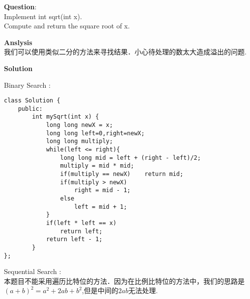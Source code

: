 \begin{description}
    \item{\textbf{Question}}:\\%
	Implement int sqrt(int x).\\
		Compute and return the square root of x.\\

    \item{\textbf{Anslysis}}\\
		我们可以使用类似二分的方法来寻找结果．小心待处理的数太大造成溢出的问题.\\

    \item{\textbf{Solution}}\\
	\item{Binary Search} : \\
		\begin{lstlisting}
class Solution {
	public:
		int mySqrt(int x) {
			long long newX = x;
			long long left=0,right=newX;
			long long multiply;
			while(left <= right){
				long long mid = left + (right - left)/2;
				multiply = mid * mid;
				if(multiply == newX)	return mid;
				if(multiply > newX)
					right = mid - 1;
				else 
					left = mid + 1;
			}
			if(left * left == x)
				return left;
			return left - 1;
		}
};
		\end{lstlisting}
	\item{Sequential Search} : \fbox{}\\
		本题目不能采用遍历比特位的方法．因为在比例比特位的方法中，我们的思路是$(a+b)^{2} = a^{2} + 2ab + b^{2}$,但是中间的$2ab$无法处理.\\
		
\end{description}

